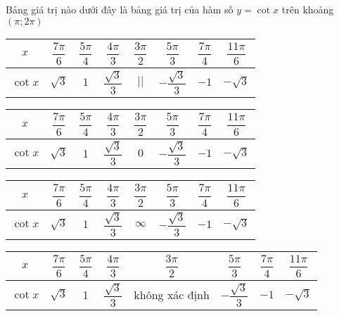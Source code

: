 \begin{ex}%
Bảng giá trị nào dưới đây là bảng giá trị của hàm số $y=\cot x$ trên khoảng $(\pi{;}2 \pi)$
\choice
{   \begin{tabular}{|c|c|c|c|c|c|c|c|}
\hline
\raisebox{1cm}{\phantom{}}$x$ & $\dfrac{7 \pi}{6}$ & $\dfrac{5 \pi}{4}$ & $\dfrac{4 \pi}{3}$ & $\dfrac{3 \pi}{2}$ & $\dfrac{5 \pi}{3}$ & $\dfrac{7 \pi}{4}$ & $\dfrac{11 \pi}{6}$\\[0.5cm]
\hline
\raisebox{1cm}{\phantom{}}$\cot x$ & $\sqrt{3}$ & $1$ & $\dfrac{\sqrt{3}}{3}$ & $||$ & $-\dfrac{\sqrt{3}}{3}$ & $-1$ & $-\sqrt{3}$ \\[0.5cm]
\hline
\end{tabular}
}
{\True  \begin{tabular}{|c|c|c|c|c|c|c|c|}
\hline
\raisebox{1cm}{\phantom{}} $x$ & $\dfrac{7 \pi}{6}$ & $\dfrac{5 \pi}{4}$ & $\dfrac{4 \pi}{3}$ & $\dfrac{3 \pi}{2}$ & $\dfrac{5 \pi}{3}$ & $\dfrac{7 \pi}{4}$ & $\dfrac{11 \pi}{6}$ \\[0.5cm]
\hline
\raisebox{1cm}{\phantom{}} $\cot x$ & $\sqrt{3}$ & 1 & $\dfrac{\sqrt{3}}{3}$ & $0$ & $-\dfrac{\sqrt{3}}{3}$ & $-1$ & $-\sqrt{3}$ \\[0.5cm]
\hline
\end{tabular}
}
{   \begin{tabular}{|c|c|c|c|c|c|c|c|}
\hline
\raisebox{1cm}{\phantom{}} $x$ & $\dfrac{7 \pi}{6}$ & $\dfrac{5 \pi}{4}$ & $\dfrac{4 \pi}{3}$ & $\dfrac{3 \pi}{2}$ & $\dfrac{5 \pi}{3}$ & $\dfrac{7 \pi}{4}$ & $\dfrac{11 \pi}{6}$ \\[0.5cm]
\hline
\raisebox{1cm}{\phantom{}} $\cot x$ & $\sqrt{3}$ & $1$ & $\dfrac{\sqrt{3}}{3}$ & $\infty$ & $-\dfrac{\sqrt{3}}{3}$ & $-1$ & $-\sqrt{3}$ \\[0.5cm]
\hline
\end{tabular}
}
{   \begin{tabular}{|c|c|c|c|c|c|c|c|}
\hline
\raisebox{1cm}{\phantom{}} $x$ & $\dfrac{7 \pi}{6}$ & $\dfrac{5 \pi}{4}$ & $\dfrac{4 \pi}{3}$ & $\dfrac{3 \pi}{2}$ & $\dfrac{5 \pi}{3}$ & $\dfrac{7 \pi}{4}$ & $\dfrac{11 \pi}{6}$ \\[0.5cm]
\hline
\raisebox{1cm}{\phantom{}} $\cot x$ & $\sqrt{3}$ & 1 & $\dfrac{\sqrt{3}}{3}$ & không xác định & $-\dfrac{\sqrt{3}}{3}$ & $-1$ & $-\sqrt{3}$ \\[0.5cm]
\hline
\end{tabular}}
\end{ex}

